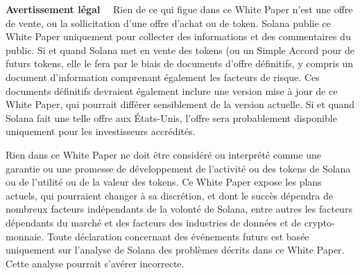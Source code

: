 \documentclass[12pt]{article}
\begin{document}
\maketitle

\textbf{\footnotesize Avertissement légal}\scriptsize
~~Rien de ce qui figue dans ce White Paper n'est une offre de vente, ou la sollicitation d'une offre d'achat ou de token. Solana publie ce White Paper uniquement pour collecter des informations et des commentaires du public. Si et quand Solana met en vente des tokens (ou un Simple Accord pour de futurs tokens, elle le fera par le biais de documents d'offre définitifs, y compris un document d'information comprenant également les facteurs de risque. Ces documents définitifs devraient également inclure une version mise à jour de ce White Paper, qui pourrait différer sensiblement de la version actuelle. Si et quand Solana fait une telle offre aux États-Unis, l'offre sera probablement disponible uniquement pour les investisseurs accrédités.

Rien dans ce White Paper ne doit être considéré ou interprété comme une garantie ou une promesse de développement de l'activité ou des tokens de Solana ou de l'utilité ou de la valeur des tokens. Ce White Paper expose les plans actuels, qui pourraient changer à sa discrétion, et dont le succès dépendra de nombreux facteurs indépendants de la volonté de Solana, entre autres les facteurs dépendants du marché et des facteurs des industries de données et de crypto-monnaie. Toute déclaration concernant des événements futurs est basée uniquement sur l'analyse de Solana des problèmes décrits dans ce White Paper. Cette analyse pourrait s’avérer incorrecte.

\begin{abstract}
Cet article propose une nouvelle architecture de blockchain basée sur la Proof of History (PoH) - une preuve pour vérifier l'ordre et le temps écoulé entre les événements. PoH est utilisé pour encoder le " temps incertain " dans un registre – constituant seulement un complément de données. Lorsqu'il est utilisé avec un algorithme de consensus comme le Proof of Work (PoW) ou Proof of Stack (PoS), PoH peut réduire la surcharge de messages dans une machine " à tolérance d’erreurs " (répliquée Byzantine), permettant un temps de traitement de moins d’une seconde. Cet article propose également deux algorithmes qui exploitent les propriétés de conservation du temps du registre PoH - un algorithme de PoS qui peut récupérer à partir de partitions de toute taille et une Proof of Replication (PoRep). La combinaison de PoRep et PoH assure une protection contre la falsification du grand livre en ce qui concerne le temps (commande) et le stockage. Le protocole est analysé sur un réseau $1$~gbps, et cet article montre que le débit peut atteindre $710$k transactions par seconde avec le matériel actuel.
\end{abstract}
\end{document}
